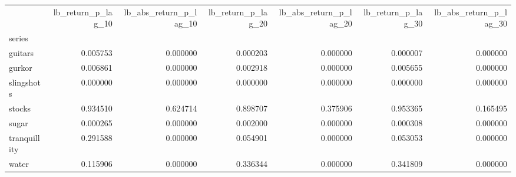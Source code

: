 \begin{tabular}{lrrrrrr}
\toprule
 & lb_return_p_lag_10 & lb_abs_return_p_lag_10 & lb_return_p_lag_20 & lb_abs_return_p_lag_20 & lb_return_p_lag_30 & lb_abs_return_p_lag_30 \\
series &  &  &  &  &  &  \\
\midrule
guitars & 0.005753 & 0.000000 & 0.000203 & 0.000000 & 0.000007 & 0.000000 \\
gurkor & 0.006861 & 0.000000 & 0.002918 & 0.000000 & 0.005655 & 0.000000 \\
slingshots & 0.000000 & 0.000000 & 0.000000 & 0.000000 & 0.000000 & 0.000000 \\
stocks & 0.934510 & 0.624714 & 0.898707 & 0.375906 & 0.953365 & 0.165495 \\
sugar & 0.000265 & 0.000000 & 0.002000 & 0.000000 & 0.000308 & 0.000000 \\
tranquillity & 0.291588 & 0.000000 & 0.054901 & 0.000000 & 0.053053 & 0.000000 \\
water & 0.115906 & 0.000000 & 0.336344 & 0.000000 & 0.341809 & 0.000000 \\
\bottomrule
\end{tabular}
